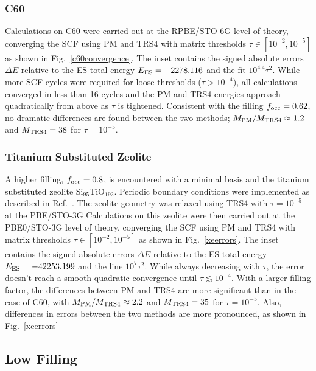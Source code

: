\commentoutA{\documentclass[prl,aps,twocolumn,showpacs,twocolumngrid,superbib]{revtex4}}
\begin{document}
\subsubsection{C60}

Calculations on C60 were carried out at the RPBE/STO-6G level of theory, converging the
SCF using PM and TRS4 with matrix thresholds $\tau \in [10^{-2},10^{-5}]$ as shown in Fig.~\ref{c60convergence}.  The inset contains 
the signed absolute errors $\Delta E$ relative to the ES total energy $E_{\rm ES}=-2278.116$ 
and the fit $10^{4.4} \tau^2$.  While more SCF cycles were required for loose thresholds ($\tau > 10^{-4}$), 
all calculations converged in less than 16 cycles and the PM and TRS4 energies approach 
quadratically from above as $\tau$ is tightened.  Consistent with the filling $f_{\rm occ}=0.62$, no dramatic
differences are found between the two methods; $M_{\rm PM}/M_{\rm TRS4} \approx 1.2$ and 
$M_{\rm TRS4}=38$ for $\tau=10^{-5}$.   

\subsubsection{Titanium Substituted Zeolite}

A higher filling, $f_{\rm occ}=0.8$, is encountered with a minimal basis and the titanium substituted zeolite 
Si$_{95}$TiO$_{192}$.  Periodic boundary conditions were implemented as described in Ref.~.    
The zeolite geometry was relaxed using TRS4 with $\tau = 10^{-5}$ at the PBE/STO-3G 
Calculations on this zeolite were then carried out at the PBE0/STO-3G level of theory,  
converging the SCF using PM and TRS4 with matrix thresholds $\tau \in [10^{-2},10^{-5}]$
as shown in Fig.~\ref{xeerrors}.  The inset contains 
the signed absolute errors $\Delta E$ relative to the ES total energy $E_{\rm ES}=-42253.199$ and the line 
$10^{7} \tau^2$.  While always decreasing with $\tau$, the error doesn't reach a smooth quadratic convergence 
until $\tau \lesssim 10^{-4}$.  With a larger filling factor, the differences between PM and TRS4 are more 
significant than in the case of C60, with $M_{\rm PM}/M_{\rm TRS4} \approx 2.2$ and $M_{\rm TRS4}=35$ for $\tau=10^{-5}$.  
Also, differences in errors between the two methods are more pronounced, as shown in Fig.~\ref{xeerrors}

\subsection{Low Filling}
\end{document}
